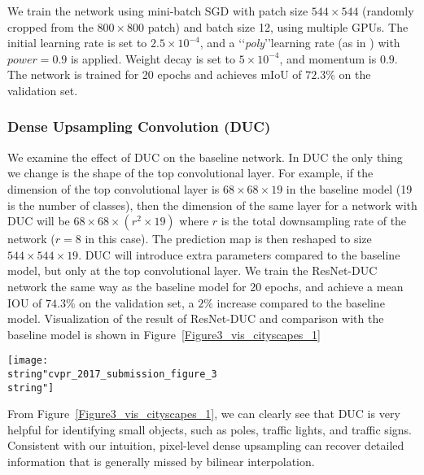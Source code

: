 \documentclass[10pt,twocolumn,letterpaper]{article}
\begin{document}
We train the network using mini-batch SGD with patch size $544\times 544$ (randomly cropped from the $800\times 800$ patch) and batch size 12, using multiple GPUs. The initial learning rate is set to $2.5\times 10^{-4}$, and a \lq\lq \textit{poly}\rq\rq   learning rate (as in \cite{chen2016deeplab}) with $power=0.9$ is applied. Weight decay is set to $5\times 10^{-4}$, and momentum is $0.9$. The network is trained for 20 epochs and achieves mIoU of $72.3\%$ on the validation set.
\vspace{-5pt}

\subsubsection{Dense Upsampling Convolution (DUC)}
We examine the effect of DUC on the baseline network. In DUC the only thing we change is the shape of the top convolutional layer. For example, if the dimension of the top convolutional layer is $68\times{68}\times{19}$ in the baseline model (19 is the number of classes), then the dimension of the same layer for a network with DUC will be $68\times{68}\times{(r^2\times 19)}$ where $r$ is the total downsampling rate of the network ($r=8$ in this case). The prediction map is then reshaped to size $544\times 544\times 19$. DUC will introduce extra parameters compared to the baseline model, but only at the top convolutional layer. We train the ResNet-DUC network the same way as the baseline model for 20 epochs, and achieve a mean IOU of \textbf{$74.3\%$} on the validation set, a $2\%$ increase compared to the baseline model. Visualization of the result of ResNet-DUC and comparison with the baseline model is shown in Figure~\ref{Figure3_vis_cityscapes_1}

\begin{figure*}[ht]
\begin{center}
\texttt{[image: \\string"cvpr\_2017\_submission\_figure\_3\\string"]}
\end{center}
\caption{Effect of Dense Upsampling Convolution (DUC) on the Cityscapes validation set. From left to right: input image, ground truth (areas with black color are ignored in evaluation), baseline model, and our ResNet-DUC model. }
\label{Figure3_vis_cityscapes_1}
\vspace{-15pt}
\end{figure*}

From Figure~\ref{Figure3_vis_cityscapes_1}, we can clearly see that DUC is very helpful for identifying small objects, such as poles, traffic lights, and traffic signs. Consistent with our intuition, pixel-level dense upsampling can recover detailed information that is generally missed by bilinear interpolation.
\end{document}
